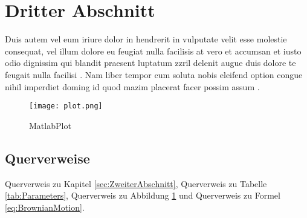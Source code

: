 \section{Dritter Abschnitt}
\label{sec:DritterAbschnitt}

Duis autem vel eum iriure dolor in hendrerit in vulputate velit esse molestie consequat, vel illum dolore eu feugiat nulla facilisis at vero et accumsan et iusto odio dignissim qui blandit praesent luptatum zzril delenit augue duis dolore te feugait nulla facilisi \cite[S. 100]{Hull2017}. Nam liber tempor cum soluta nobis eleifend option congue nihil imperdiet doming id quod mazim placerat facer possim assum \citep{Schwerdtfeger2013,Bookstaber1986}.

\begin{figure}[htbp!]
    \centering
    \texttt{[image: plot.png]}
    \caption{MatlabPlot}
    \label{fig:MatlabPlot}
\end{figure}

\subsection{Querverweise}
\label{sec:Querverweise}
Querverweis zu Kapitel \ref{sec:ZweiterAbschnitt}, Querverweis zu Tabelle \ref{tab:Parameters}, Querverweis zu Abbildung \ref{fig:MatlabPlot} und Querverweis zu Formel \eqref{eq:BrownianMotion}.